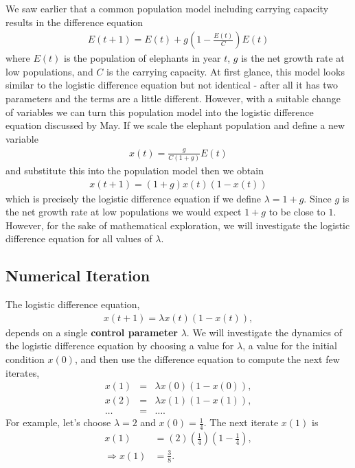 \documentclass{tufte-handout}
\begin{document}
We saw earlier that a common population model including carrying capacity results in the difference equation
\begin{eqnarray*}
E(t+1) = E(t) + g(1 - \frac{E(t)}{C}) E(t)
\end{eqnarray*}
where $E(t)$ is the population of elephants in year $t$, $g$ is the net growth rate at low populations, and $C$ is the carrying capacity. At first glance, this model looks similar to the logistic difference equation but not identical - after all it has two parameters and the terms are a little different. However, with a suitable change of variables we can turn this population model into the logistic difference equation discussed by May. If we scale the elephant population and define a new variable
\begin{eqnarray*}
x(t) = \frac{g}{C(1+g)} E(t)
\end{eqnarray*}
and substitute this into the population model then we obtain
\begin{eqnarray*}
x(t+1) = (1+g) x(t) (1-x(t))
\end{eqnarray*}
which is precisely the logistic difference equation if we define $\lambda = 1 + g$. Since $g$ is the net growth rate at low populations we would expect $1+g$ to be close to $1$. However, for the sake of mathematical exploration, we will investigate the logistic difference equation for all values of $\lambda$.
 
\subsection*{Numerical Iteration}

The logistic difference equation,
\begin{eqnarray}
x(t+1) = \lambda x(t) (1-x(t)),
\end{eqnarray}
depends on a single {\bf control parameter} $\lambda$. We will investigate the dynamics of the logistic difference equation by choosing a value for $\lambda$, a value for the initial condition $x(0)$, and then use the difference equation to compute the next few  iterates,
\begin{eqnarray*}
x(1) &=& \lambda x(0) (1-x(0)), \\
x(2) &=& \lambda x(1) (1 - x(1)), \\
\ldots &=& \ldots.
\end{eqnarray*}
For example, let's choose $\lambda = 2$ and $x(0) =\frac{1}{4}$. The next iterate $x(1)$ is
\begin{align*}
x(1) &= (2) (\frac{1}{4})  (1 - \frac{1}{4}), \\
\Rightarrow x(1) &= \frac{3}{8}.
\end{align*} 
\end{document}
